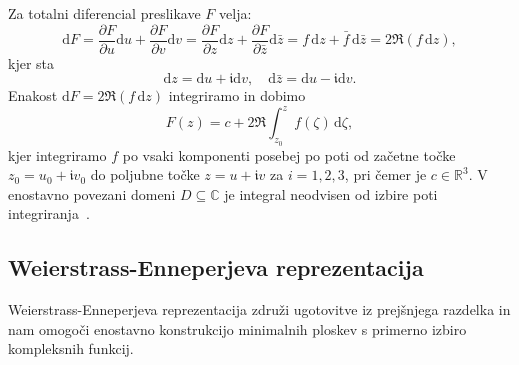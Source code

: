 \documentclass[fin1, tisk, bibtex]{fmfdelo}
\begin{document}
\begin{dokaz}
    Za totalni diferencial preslikave $F$ velja: 
    \begin{equation*}
        \mathrm{d} F=\frac{\partial F}{\partial u} \mathrm{d} u+\frac{\partial F}{\partial v} \mathrm{d} v=\frac{\partial F}{\partial z} \mathrm{d} z+\frac{\partial F}{\partial \bar{z}} \mathrm{d} \bar{z} =f \, \mathrm{d} z+\bar{f} \, \mathrm{d} \bar{z}=2 \Re(f \, \mathrm{d} z),
    \end{equation*}  
    kjer sta 
    \begin{equation*}
        \mathrm{d} z=\mathrm{d} u+\mathfrak{i} \mathrm{d} v, \quad \mathrm{d} \bar{z}=\mathrm{d} u-\mathfrak{i} \mathrm{d} v.
    \end{equation*} 
    Enakost $\mathrm{d} F = 2 \Re\left(f \, \mathrm{d} z\right)$ integriramo in dobimo
    \begin{equation*}
        F(z)=c+2 \Re\int_{z_0}^z f(\zeta) \, \mathrm{d} \zeta,
    \end{equation*}
    kjer integriramo $f$ po vsaki komponenti posebej po poti od začetne točke $z_0=u_0+\mathfrak{i} v_0$ do poljubne točke $z=u+\mathfrak{i} v$ za $i=1,2, 3$, pri čemer je $c \in \mathbb{R}^3$. V enostavno povezani domeni $D \subseteq \mathbb{C}$ je integral neodvisen od izbire poti integriranja~\cite[str.~53]{sanbernardino}.
\end{dokaz}


\subsection{Weierstrass-Enneperjeva reprezentacija}

Weierstrass-Enneperjeva reprezentacija združi ugotovitve iz prejšnjega razdelka in nam omogoči enostavno konstrukcijo minimalnih ploskev s primerno izbiro kompleksnih funkcij.
\end{document}
